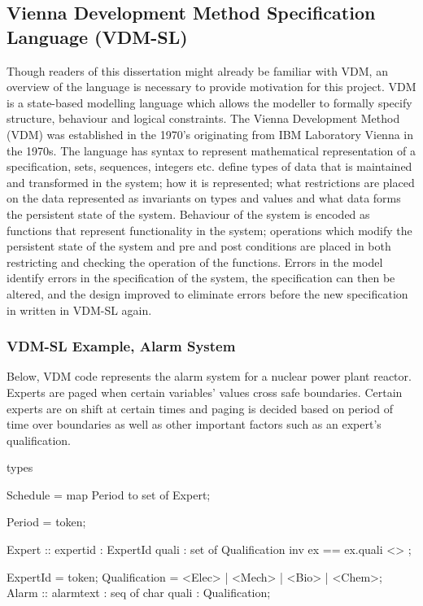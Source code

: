 \subsection{Vienna Development Method Specification Language (VDM-SL)}
Though readers of this dissertation might already be familiar with VDM, an overview of the language is necessary to provide motivation for this project. VDM is a state-based modelling language which allows the modeller to formally specify structure, behaviour and logical constraints. The Vienna Development Method (VDM) was established in the 1970's originating from IBM Laboratory Vienna in the 1970s. The language has syntax to represent mathematical representation of a specification, sets, sequences, integers etc. define types of data that is maintained and transformed in the system; how it is represented; what restrictions are placed on the data represented as invariants on types and values and what data forms the persistent state of the system. Behaviour of the system is encoded as functions that represent functionality in the system; operations which modify the persistent state of the system and pre and post conditions are placed in both restricting and checking the operation of the functions. Errors in the model identify errors in the specification of the system, the specification can then be altered, and the design improved to eliminate errors before the new specification in written in VDM-SL again.



\subsubsection{VDM-SL Example, Alarm System}
Below, VDM code represents the alarm system for a nuclear power plant reactor. Experts are paged when certain variables' values cross safe boundaries. Certain experts are on shift at certain times and paging is decided based on period of time over boundaries as well as other important factors such as an expert’s qualification.


\begin{vdmsl}[label=lst:AlarmSL.vdmsl,caption=Types of data used in the alarm system in VDM-SL]
types

Schedule = map Period to set of Expert;

Period = token;

Expert :: expertid : ExpertId
quali : set of Qualification
inv ex == ex.quali <> {};

ExpertId = token;
Qualification = <Elec> | <Mech> | <Bio> | <Chem>;
Alarm :: alarmtext : seq of char
quali : Qualification;
\end{vdmsl}

